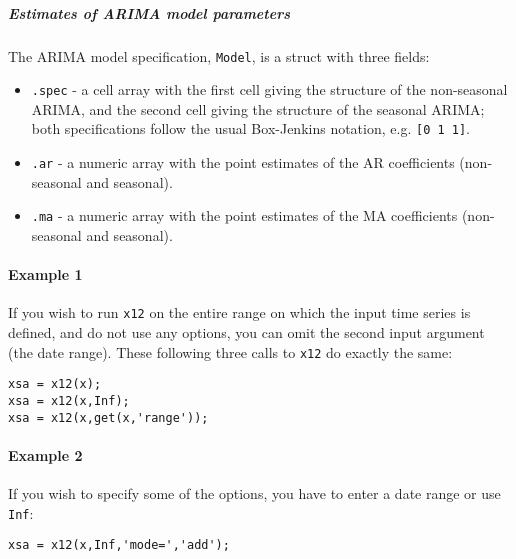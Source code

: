 \subparagraph{Estimates of ARIMA model
parameters}\label{estimates-of-arima-model-parameters}

The ARIMA model specification, \texttt{Model}, is a struct with three
fields:

\begin{itemize}
\item
  \texttt{.spec} - a cell array with the first cell giving the structure
  of the non-seasonal ARIMA, and the second cell giving the structure of
  the seasonal ARIMA; both specifications follow the usual Box-Jenkins
  notation, e.g. \texttt{{[}0 1 1{]}}.
\item
  \texttt{.ar} - a numeric array with the point estimates of the AR
  coefficients (non-seasonal and seasonal).
\item
  \texttt{.ma} - a numeric array with the point estimates of the MA
  coefficients (non-seasonal and seasonal).
\end{itemize}

\paragraph{Example 1}\label{example-1}

If you wish to run \texttt{x12} on the entire range on which the input
time series is defined, and do not use any options, you can omit the
second input argument (the date range). These following three calls to
\texttt{x12} do exactly the same:

\begin{verbatim}
xsa = x12(x);
xsa = x12(x,Inf);
xsa = x12(x,get(x,'range'));
\end{verbatim}

\paragraph{Example 2}\label{example-2}

If you wish to specify some of the options, you have to enter a date
range or use \texttt{Inf}:

\begin{verbatim}
xsa = x12(x,Inf,'mode=','add');
\end{verbatim}


